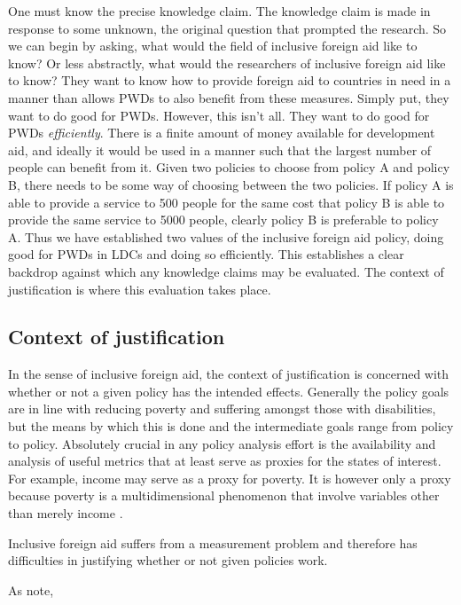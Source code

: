 \documentclass[a4paper]{article}
\begin{document}
One must know the precise knowledge claim. The knowledge claim is made in
response to some unknown, the original question that prompted the research.
So we can begin by asking, what would the field of inclusive foreign aid like
to know? Or less abstractly, what would the researchers of inclusive foreign
aid like to know? They want to know how to provide foreign aid to countries in
need in a manner than allows PWDs to also benefit from these measures. Simply
put, they want to do good for PWDs. However, this isn't all. They want to do
good for PWDs \emph{efficiently}. There is a finite amount of money available
for development aid, and ideally it would be used in a manner such that the
largest number of people can benefit from it. Given two policies to choose
from policy A and policy B, there needs to be some way of choosing between the
two policies. If policy A is able to provide a service to 500 people for the
same cost that policy B is able to provide the same service to 5000 people,
clearly policy B is preferable to policy A. Thus we have established two
values of the inclusive foreign aid policy, doing good for PWDs in LDCs and
doing so efficiently. This establishes a clear backdrop against which any
knowledge claims may be evaluated. The context of justification is where this
evaluation takes place.



\subsection{Context of justification}

In the sense of inclusive foreign aid, the context of justification is
concerned with whether or not a given policy has the intended effects.
Generally the policy goals are in line with reducing poverty and suffering
amongst those with disabilities, but the means by which this is done and the
intermediate goals range from policy to policy. Absolutely crucial in any
policy analysis effort is the availability and analysis of useful metrics that
at least serve as proxies for the states of interest. For example, income may
serve as a proxy for poverty. It is however only a proxy because poverty is a
multidimensional phenomenon that involve variables other than merely income
\cite{alkire2011understandings}.

Inclusive foreign aid suffers from a measurement problem and therefore has
difficulties in justifying whether or not given policies work.

As \cite{ingstad2011disability} note, 
\end{document}
